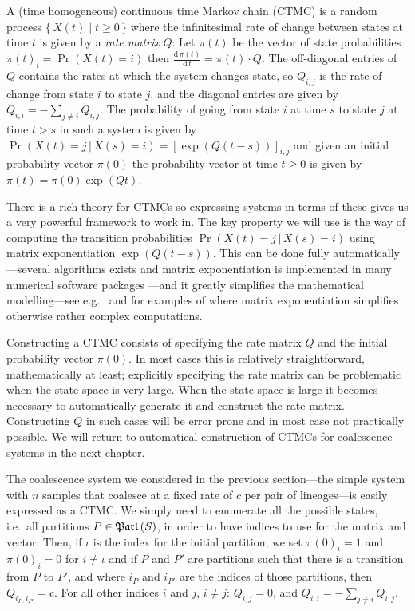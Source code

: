 A (time homogeneous) continuous time Markov chain (CTMC) is a random process $\{\,X(t) \;|\; t \geq 0 \,\}$ where the infinitesimal rate of change between states at time $t$ is given by a \emph{rate matrix} $Q$: Let $\pi(t)$ be the vector of state probabilities $\pi(t)_i = \Pr(X(t)=i)$ then $\frac{\mathrm{d}\,\pi(t)}{\mathrm{d}\,t} = \pi(t)\cdot Q$. The off-diagonal entries of $Q$ contains the rates at which the system changes state, so $Q_{i,j}$ is the rate of change from state $i$ to state $j$, and the diagonal entries are given by $Q_{i,i} = - \sum_{j\neq i} Q_{i,j}$. The probability of going from state $i$ at time $s$ to state $j$ at time $t>s$ in such a system is given by $\Pr(X(t)=j\,|\,X(s)=i) = \left[\exp\left(Q\left(t-s\right)\right)\right]_{i,j}$ and given an initial probability vector $\pi(0)$ the probability vector at time $t\geq 0$ is given by $\pi(t)=\pi(0)\exp(Qt)$.

There is a rich theory for CTMCs so expressing systems in terms of these gives us a very powerful framework to work in. The key property we will use is the way of computing the transition probabilities $\Pr(X(t)=j\,|\,X(s)=i)$ using matrix exponentiation $\exp\left(Q\left(t-s\right)\right)$. This can be done fully automatically---several algorithms exists and matrix exponentiation is implemented in many numerical software packages \cite{Moler2003}---and it greatly simplifies the mathematical modelling---see e.g.\ \citet{Hobolth:2011hl} and \citet{Andersen:2013iz} for examples of where matrix exponentiation simplifies otherwise rather complex computations.

Constructing a CTMC consists of specifying the rate matrix $Q$ and the initial probability vector $\pi(0)$. In most cases this is relatively straightforward, mathematically at least; explicitly specifying the rate matrix can be problematic when the state space is very large. When the state space is large it becomes necessary to automatically generate it and construct the rate matrix. Constructing $Q$ in such cases will be error prone and in most case not practically possible. We will return to automatical construction of CTMCs for coalescence systems in the next chapter.

The coalescence system we considered in the previous section---the simple system with $n$ samples that coalesce at a fixed rate of $c$ per pair of lineages---is easily expressed as a CTMC. We simply need to enumerate all the possible states, i.e.\ all partitions $P\in\mathfrak{Part}\left(S\right)$, in order to have indices to use for the matrix and vector. Then, if $\iota$ is the index for the initial partition, we set $\pi(0)_\iota=1$ and $\pi(0)_i=0$ for $i\neq\iota$ and if $P$ and $P'$ are partitions such that there is a transition from $P$ to $P'$, and where $i_P$ and $i_{P'}$ are the indices of those partitions, then $Q_{i_P,i_{P'}}=c$. For all other indices $i$ and $j$, $i\neq j$: $Q_{i,j}=0$, and $Q_{i,i}=-\sum_{j\neq i} Q_{i,j}$.


